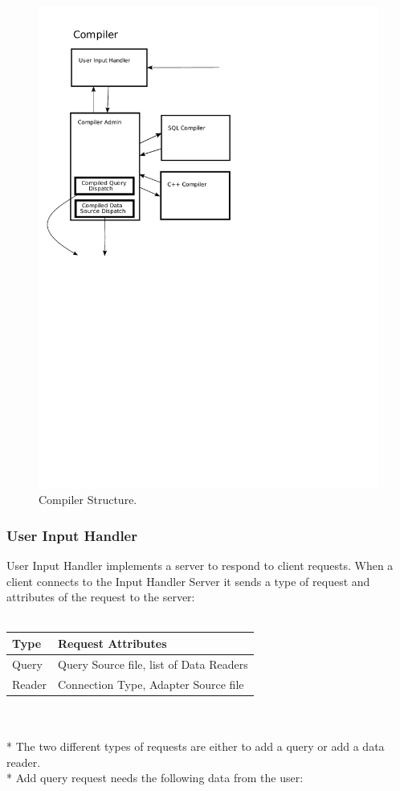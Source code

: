 \documentclass[14pt]{article}
\begin{document}
\begin{figure}
  \includegraphics[width=4.50in]{../figures/compiler.pdf}
  \caption{Compiler Structure.}
  \label{CompilerPicture}
\end{figure}

\subsubsection{User Input Handler}
User Input Handler implements a server to respond to client requests. When a client connects to the Input Handler Server it sends a type of request and attributes of the request to the server:
\\
\\
\begin{tabular}{|l|l|}
  \hline
  Type & Request Attributes \\ \hline
  Query & Query Source file, list of Data Readers \\ \hline
  Reader & Connection Type, Adapter Source file \\ \hline
\end{tabular}
\\
\\*
The two different types of requests are either to add a query or add a data reader.
\\*
Add query request needs the following data from the user:
\end{document}
